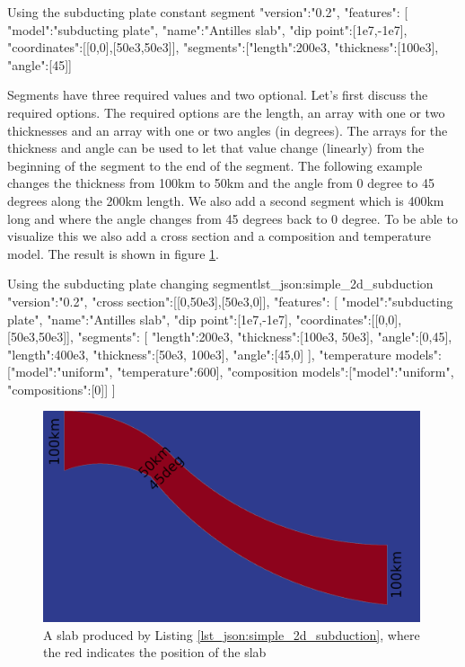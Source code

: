\documentclass{book}
\begin{document}
\begin{javascriptcode}{Using the subducting plate constant segment}{}
{
"version":"0.2",
"features":
[
     {
       "model":"subducting plate", "name":"Antilles slab", "dip point":[1e7,-1e7],
       "coordinates":[[0,0],[50e3,50e3]], 
       "segments":[{"length":200e3, "thickness":[100e3], "angle":[45]}]
    }
}
\end{javascriptcode}

Segments have three required values and two optional. Let's first discuss the required options. The required options are the length, an array with one or two thicknesses and an array with one or two angles (in degrees). The arrays for the thickness and angle can be used to let that value change (linearly) from the beginning of the segment to the end of the segment. The following example changes the thickness from 100km to 50km and the angle from 0 degree to 45 degrees along the 200km length. We also add a second segment which is 400km long and where the angle changes from 45 degrees back to 0 degree. To be able to visualize this we also add a cross section and a composition and temperature model. The result is shown in figure \ref{fig:simple_2d_subduction_1}.

\begin{javascriptcode}{Using the subducting plate changing segment}{lst_json:simple_2d_subduction}
{
  "version":"0.2",
  "cross section":[[0,50e3],[50e3,0]],
  "features":
  [
     {
       "model":"subducting plate", "name":"Antilles slab", "dip point":[1e7,-1e7],
       "coordinates":[[0,0],[50e3,50e3]], 
       "segments":
       [
         {"length":200e3, "thickness":[100e3, 50e3], "angle":[0,45]},
         {"length":400e3, "thickness":[50e3, 100e3], "angle":[45,0]}
       ],
       "temperature models":[{"model":"uniform", "temperature":600}],
       "composition models":[{"model":"uniform", "compositions":[0]}]
    }
  ]
}
\end{javascriptcode}

\begin{figure}
    \centering
    \includegraphics[width=0.99\textwidth]{simple_subducting_plate_example.png}
    \caption{A slab produced by Listing \ref{lst_json:simple_2d_subduction}, where the red indicates the position of the slab}
    \label{fig:simple_2d_subduction_1}
\end{figure}
\end{document}
